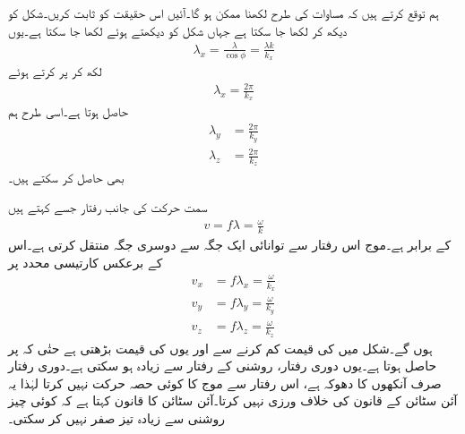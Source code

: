 ہم توقع کرتے ہیں کہ مساوات  کی طرح  لکھنا ممکن ہو گا۔آئیں اس حقیقت کو ثابت کریں۔شکل   کو دیکھ کر  لکھا جا سکتا ہے جہاں شکل کو دیکھتے ہوئے  لکھا جا سکتا ہے۔یوں
\begin{align*}
\lambda_x=\frac{\lambda}{\cos \phi}=\frac{\lambda k}{k_x}
\end{align*}
لکھ کر  پر کرتے ہوئے
\begin{align}
\lambda_x=\frac{2\pi}{k_x}
\end{align}
حاصل ہوتا ہے۔اسی طرح ہم 
\begin{align}
\lambda_y&=\frac{2\pi}{k_y}\\
\lambda_z&=\frac{2\pi}{k_z}
\end{align}
بھی حاصل کر سکتے ہیں۔

سمت حرکت کی جانب رفتار جسے  کہتے ہیں
\begin{align}
v=f\lambda=\frac{\omega}{k}
\end{align}
کے برابر ہے۔موج اس رفتار سے توانائی ایک جگہ سے دوسری جگہ منتقل کرتی ہے۔اس کے برعکس کارتیسی محدد پر  
\begin{align*}
v_x&=f \lambda_x=\frac{\omega}{k_x}\\
v_y&=f \lambda_y=\frac{\omega}{k_y}\\
v_z&=f \lambda_z=\frac{\omega}{k_z}
\end{align*}
ہوں گے۔شکل  میں  کی قیمت کم کرنے سے  اور یوں  کی قیمت بڑھتی ہے حتٰی کہ  پر  حاصل ہوتا ہے۔یوں دوری رفتار، روشنی کے رفتار سے زیادہ ہو سکتی ہے۔دوری رفتار  صرف آنکھوں کا دھوکہ ہے، اس رفتار سے موج کا کوئی حصہ حرکت نہیں کرتا لہٰذا یہ  آئن سٹائن کے قانون کی خلاف ورزی نہیں کرتا۔آئن سٹائن کا قانون کہتا ہے کہ کوئی چیز روشنی سے زیادہ تیز صفر نہیں کر سکتی۔


